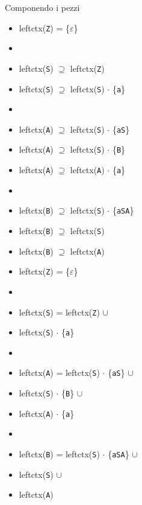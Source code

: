 Componendo i pezzi
\begin{multicols}{2}
    \begin{itemize}
        \item leftctx(\texttt{Z}) = \{$\varepsilon$\}
        \item[]
        \item leftctx(\texttt{S}) $\supseteq$ leftctx(\texttt{Z})
        \item leftctx(\texttt{S}) $\supseteq$ leftctx(\texttt{S}) $\cdot$ \{\texttt{a}\}
        \item[]
        \item leftctx(\texttt{A}) $\supseteq$ leftctx(\texttt{S}) $\cdot$ \{\texttt{aS}\}
        \item leftctx(\texttt{A}) $\supseteq$ leftctx(\texttt{S}) $\cdot$ \{\texttt{B}\}
        \item leftctx(\texttt{A}) $\supseteq$ leftctx(\texttt{A}) $\cdot$ \{\texttt{a}\}
        \item[]
        \item leftctx(\texttt{B}) $\supseteq$ leftctx(\texttt{S}) $\cdot$ \{\texttt{aSA}\}
        \item leftctx(\texttt{B}) $\supseteq$ leftctx(\texttt{S})
        \item leftctx(\texttt{B}) $\supseteq$ leftctx(\texttt{A})
    \end{itemize}
    \columnbreak
    \begin{itemize}
        \item[] leftctx(\texttt{Z}) = \{$\varepsilon$\}
        \item[]
        \item[] leftctx(\texttt{S}) = leftctx(\texttt{Z}) $\cup$
        \item[] \makebox[2.16cm]{}    leftctx(\texttt{S}) $\cdot$ \{\texttt{a}\}
        \item[]
        \item[] leftctx(\texttt{A}) = leftctx(\texttt{S}) $\cdot$ \{\texttt{aS}\} $\cup$
        \item[] \makebox[2.16cm]{}    leftctx(\texttt{S}) $\cdot$ \{\texttt{B}\} $\cup$
        \item[] \makebox[2.16cm]{}    leftctx(\texttt{A}) $\cdot$ \{\texttt{a}\}
        \item[]
        \item[] leftctx(\texttt{B}) = leftctx(\texttt{S}) $\cdot$ \{\texttt{aSA}\} $\cup$
        \item[] \makebox[2.16cm]{}    leftctx(\texttt{S}) $\cup$
        \item[] \makebox[2.16cm]{}    leftctx(\texttt{A})
    \end{itemize}
\end{multicols}
